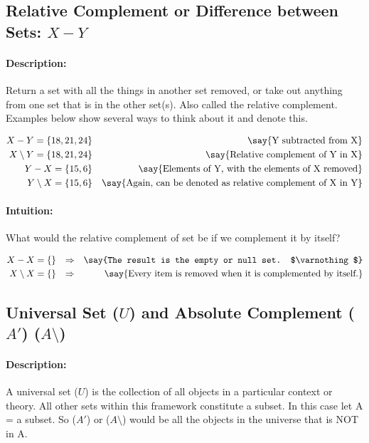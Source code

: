 \documentclass[12pt]{article}
\begin{document}
  \subsection{Relative Complement or Difference between Sets: $X - Y$}
  \paragraph{Description:} Return a set with all the things in another set removed, or take out anything from one set that is in the other set(s). Also called the relative complement. Examples below show several ways to think about it and denote this. %

  \begin{align}
    X - Y = \{18, 21, 24\} &&
    \text{\say{Y subtracted from X}} \\
    X \setminus Y = \{18, 21, 24\} &&
    \text{\say{Relative complement of Y in X}} \\
    Y - X = \{15, 6\} &&
    \text{\say{Elements of Y, with the elements of X removed}} \\
    Y \setminus X = \{15, 6\} &&
    \text{\say{Again, can be denoted as relative complement of X in Y}}
  \end{align}%

  \paragraph{Intuition:} What would the relative complement of set be if we complement it by itself?

  \begin{align}
    X - X = \{\} && \Rightarrow &&
    \text{\say{The result is the empty or null set. $\varnothing$}} \\
    X \setminus X = \{\} && \Rightarrow &&
    \text{\say{Every item is removed when it is complemented by itself.}}
  \end{align}%


  \subsection{Universal Set ($U$) and Absolute Complement ($A'$) ($A\setminus$)}

  \paragraph{Description:}
  A universal set ($U$) is the collection of all objects in a particular context or theory. All other sets within this framework constitute a subset. In this case let A = a subset. So ($A'$) or ($A\setminus$) would be all the objects in the universe that is NOT in A.
\end{document}
